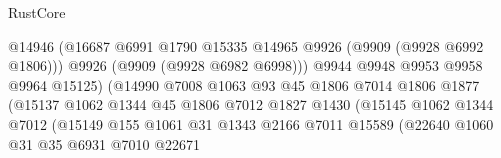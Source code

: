 \begin{lexlean}{RustCore}
\begin{coremodule}
                                          @14946
                                          (@16687
                                            @6991
                                            @1790
                                            @15335
                                            @14965
                                            @9926
                                            (@9909 (@9928 @6992 @1806)))
                                          @9926
                                          (@9909 (@9928 @6982 @6998)))
                                        @9944
                                        @9948
                                        @9953
                                        @9958
                                        @9964
                                        @15125)
                                      (@14990
                                        @7008
                                        @1063
                                        @93
                                        @45
                                        @1806
                                        @7014
                                        @1806
                                        @1877
                                        (@15137
                                          @1062
                                          @1344
                                          @45
                                          @1806
                                          @7012
                                          @1827
                                          @1430
                                          (@15145
                                            @1062
                                            @1344
                                            @7012
                                            (@15149
                                              @155
                                              @1061
                                              @31
                                              @1343
                                              @2166
                                              @7011
                                              @15589
                                              (@22640
                                                @1060
                                                @31
                                                @35
                                                @6931
                                                @7010
                                                @22671

\end{coremodule}
\end{lexlean}
